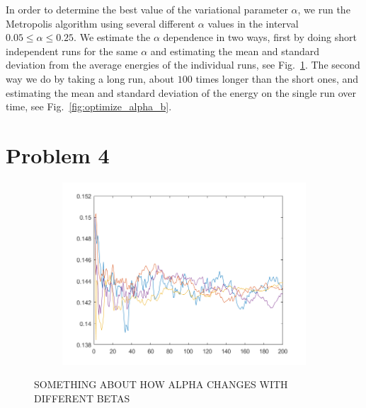 In order to determine the best value of the variational parameter $\alpha$, we run the Metropolis algorithm using several different $\alpha$ values in the interval $0.05 \leq \alpha \leq 0.25$. We estimate the $\alpha$ dependence in two ways, first by doing short independent runs for the same $\alpha$ and estimating the mean and standard deviation from the average energies of the individual runs, see Fig.~\ref{fig:optimize_alpha_a}. The second way we do by taking a long run, about $100$ times longer than the short ones, and estimating the mean and standard deviation of the energy on the single run over time, see Fig.~\ref{fig:optimize_alpha_b}. 

\section*{Problem 4}

\begin{figure}[H]
	\centering
	\captionsetup[subfigure]{justification=centering}
	\begin{subfigure}[b]{0.7\textwidth}
		\centering
		\includegraphics[width=\textwidth]{graphics/task4/beta_dep.png}
		\caption{}
		\label{fig:optimize_alpha_a}
	\end{subfigure}
	\caption{SOMETHING ABOUT HOW ALPHA CHANGES WITH DIFFERENT BETAS}
	\label{fig:beta_dep}
\end{figure}


